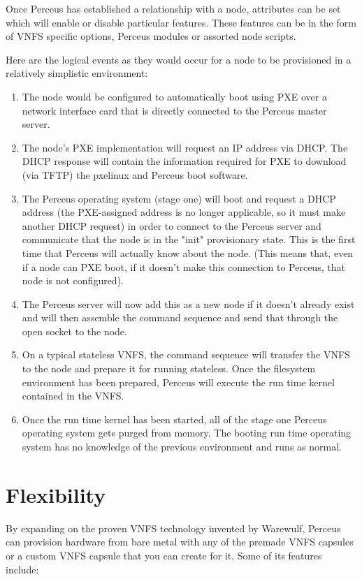 \documentclass[10pt,letterpaper]{report}
\begin{document}
Once Perceus has established a relationship with a node, attributes can be set
which will enable or disable particular features. These features can be in the
form of VNFS specific options, Perceus modules or assorted node scripts.

Here are the logical events as they would occur for a node to be provisioned in
a relatively simplistic environment:

\begin{enumerate}

\item The node would be configured to automatically boot using PXE over a
network interface card that is directly connected to the Perceus master server.

\item The node's PXE implementation will request an IP address via DHCP.  The
DHCP response will contain the information required for PXE to download (via
TFTP) the pxelinux and Perceus boot software.

\item The Perceus operating system (stage one) will boot and request a DHCP
address (the PXE-assigned address is no longer applicable, so it must make
another DHCP request) in order to connect to the Perceus server and communicate
that the node is in the "init" provisionary state. This is the first time that
Perceus will actually know about the node.  (This means that, even if a node
can PXE boot, if it doesn't make this connection to Perceus, that node is not
configured).

\item The Perceus server will now add this as a new node if it doesn't already
exist and will then assemble the command sequence and send that through the
open socket to the node.

\item On a typical stateless VNFS, the command sequence will transfer the VNFS
to the node and prepare it for running stateless. Once the filesystem
environment has been prepared, Perceus will execute the run time kernel
contained in the VNFS.

\item Once the run time kernel has been started, all of the stage one Perceus
operating system gets purged from memory. The booting run time operating system
has no knowledge of the previous environment and runs as normal.

\end{enumerate}

\section{Flexibility}
By expanding on the proven VNFS technology invented by Warewulf, Perceus can
provision hardware from bare metal with any of the premade VNFS capsules or a
custom VNFS capsule that you can create for it. Some of its features include:
\end{document}
